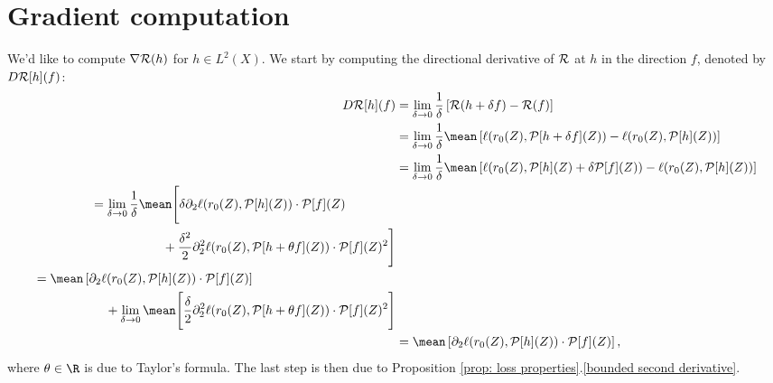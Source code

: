 \section{Gradient computation}

We'd like to compute $ \nabla \mathcal{R} ( h ) $ for $ h \in L^{ 2 } ( X ) $.
We start by computing the directional derivative of $ \mathcal{R} $ at $ h $ in the direction $ f $, denoted by $ D \mathcal{R} [ h ] ( f ) $:
\begin{align*}
    D \risk [ h ] ( f )
    &= \lim\limits_{ \delta \to 0 } \frac{ 1 }{ \delta } \left[
        \risk ( h + \delta f ) - \risk ( f )
    \right] \\
    &= \lim\limits_{ \delta \to 0 } \frac{ 1 }{ \delta } \mean \left[
        \ell ( r_{ 0 } ( Z ), \meanop [ h + \delta f ] ( Z ) )
        -
        \ell ( r_{ 0 } ( Z ), \meanop [ h ] ( Z ) )
    \right] \\
    &= \lim\limits_{ \delta \to 0 } \frac{ 1 }{ \delta } \mean \left[
        \ell ( r_{ 0 } ( Z ), \meanop [ h ] ( Z ) + \delta \meanop [ f ] ( Z ) )
        -
        \ell ( r_{ 0 } ( Z ), \meanop [ h ] ( Z ) )
    \right] \\
    \begin{split}
        &= \lim\limits_{ \delta \to 0 } \frac{ 1 }{ \delta } \mean \Biggl[
            \delta \partial_{ 2 } \ell ( r_{ 0 } ( Z ), \meanop [ h ] ( Z ) ) \cdot \meanop [ f ] ( Z ) \\
        &\hspace{2cm}+ \frac{ \delta^2 }{ 2 } \partial_{ 2 }^2 \ell ( r_{ 0 } ( Z ) , \meanop [ h + \theta f ] ( Z ) ) \cdot \meanop [ f ] ( Z )^2
        \Biggr]
    \end{split} \\
    \begin{split}
        &= \mean \left[
            \partial_{ 2 } \ell ( r_{ 0 } ( Z ), \meanop [ h ] ( Z ) ) \cdot \meanop [ f ] ( Z )
        \right] \\
        &\hspace{2cm}+ \lim\limits_{ \delta \to 0 } \mean \Biggl[
            \frac{ \delta }{ 2 } \partial_{ 2 }^2 \ell ( r_{ 0 } ( Z ) , \meanop [ h + \theta f ] ( Z ) ) \cdot \meanop [ f ] ( Z )^2
        \Biggr]
    \end{split} \\
    &= \mean \left[
        \partial_{ 2 } \ell ( r_{ 0 } ( Z ), \meanop [ h ] ( Z ) ) \cdot \meanop [ f ] ( Z )
    \right]
,\end{align*}
where $ \theta \in \R $ is due to Taylor's formula.
The last step is then due to Proposition \ref{prop: loss properties}.\ref{bounded second derivative}.

